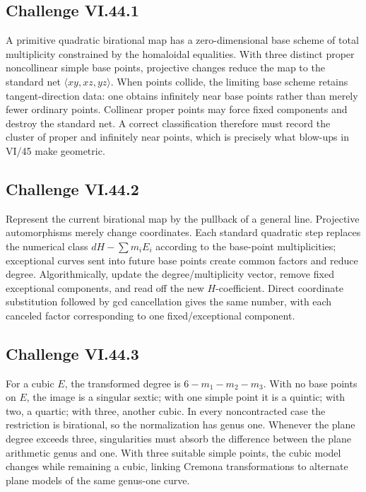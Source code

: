 \subsection*{Challenge VI.44.1}
\begin{solution}
A primitive quadratic birational map has a zero-dimensional base scheme of total multiplicity constrained by the homaloidal equalities.  With three distinct proper noncollinear simple base points, projective changes reduce the map to the standard net \(\langle xy,xz,yz\rangle\).  When points collide, the limiting base scheme retains tangent-direction data: one obtains infinitely near base points rather than merely fewer ordinary points.  Collinear proper points may force fixed components and destroy the standard net.  A correct classification therefore must record the cluster of proper and infinitely near points, which is precisely what blow-ups in VI/45 make geometric.
\end{solution}

\subsection*{Challenge VI.44.2}
\begin{solution}
Represent the current birational map by the pullback of a general line.  Projective automorphisms merely change coordinates.  Each standard quadratic step replaces the numerical class \(dH-\sum m_iE_i\) according to the base-point multiplicities; exceptional curves sent into future base points create common factors and reduce degree.  Algorithmically, update the degree/multiplicity vector, remove fixed exceptional components, and read off the new \(H\)-coefficient.  Direct coordinate substitution followed by gcd cancellation gives the same number, with each canceled factor corresponding to one fixed/exceptional component.
\end{solution}

\subsection*{Challenge VI.44.3}
\begin{solution}
For a cubic \(E\), the transformed degree is \(6-m_1-m_2-m_3\).  With no base points on \(E\), the image is a singular sextic; with one simple point it is a quintic; with two, a quartic; with three, another cubic.  In every noncontracted case the restriction is birational, so the normalization has genus one.  Whenever the plane degree exceeds three, singularities must absorb the difference between the plane arithmetic genus and one.  With three suitable simple points, the cubic model changes while remaining a cubic, linking Cremona transformations to alternate plane models of the same genus-one curve.
\end{solution}

